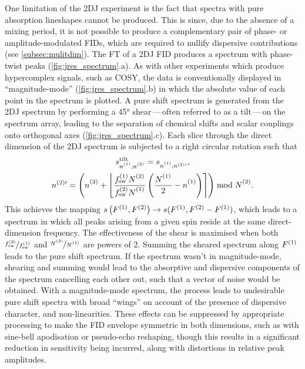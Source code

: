 One limitation of the \ac{2DJ} experiment is the fact that
spectra with pure absorption lineshapes cannot be produced. This is since, due
to the absence of a mixing period, it is not possible to produce a
complementary pair of phase- or amplitude-modulated \acp{FID}, which are
required to nullify dispersive contributions (see
\cref{subsec:mulitdim}).
The FT of a \ac{2DJ} \ac{FID} produces a spectrum with phase-twist
peaks (\cref{fig:jres_spectrum}.a). As with other experiments which
produce hypercomplex signals, such as \ac{COSY}, the data is conventionally
displayed in ``magnitude-mode'' (\cref{fig:jres_spectrum}.b) in which the
absolute value of each point in the spectrum is plotted.
A pure shift spectrum is generated from the \ac{2DJ} spectrum by performing a
\ang{45} shear\,---\,often referred to as a tilt\,---\,on the spectrum array,
leading to the separation of chemical shifts and scalar couplings onto
orthogonal axes (\cref{fig:jres_spectrum}.c). Each slice through the
direct dimension of the \ac{2DJ} spectrum is subjected to a right circular
rotation such that
\begin{subequations}
    \begin{gather}
        s_{\none,\ntwo}^{\text{tilt}} =
            s_{\none,n^{(2)\prime}},\\
        n^{(2)\prime} = \left(\ntwo + \left\lfloor
                \frac
                    {\fswone \Ntwo\vpsub{\mathrm{sw}}}
                    {\fswtwo \None\vpsub{\mathrm{sw}}}
                \left(
                    \frac{\None\vpsub{\mathrm{sw}}}{2} - \none
                \right)
            \right\rceil
        \right) \bmod \Ntwo.
    \end{gather}
\end{subequations}
This achieves the mapping $s\left(F^{(1)},F^{(2)}\right) \rightarrow s(F^{(1)}, F^{(2)}
- F^{(1)})$, which leads to a spectrum in which all peaks arising from a
given spin reside at the same direct-dimension frequency. The
effectiveness of the shear is maximised when both $\nicefrac{f_{\mathrm{sw}}^{(2)}}{f_{\mathrm{sw}}^{(1)}}$
and $\nicefrac{\Ntwo}{\None}$ are powers of 2. Summing the
sheared spectrum along $F^{(1)}$ leads to the pure shift spectrum.
If the spectrum wasn't in magnitude-mode, shearing and summing would lead to
the absorptive and dispersive components of the spectrum cancelling each other
out, such that a vector of noise would be obtained.
With a magnitude-mode spectrum, the process leads to undesirable pure shift
spectra with broad ``wings'' on account of the presence of dispersive
character, and non-linearities. These effects can be suppressed by appropriate
processing to make the FID envelope symmetric in both dimensions, such as with
sine-bell apodisation or pseudo-echo reshaping\cite{Bax1981}, though this
results in a significant reduction in sensitivity being incurred, along with
distortions in relative peak amplitudes.

